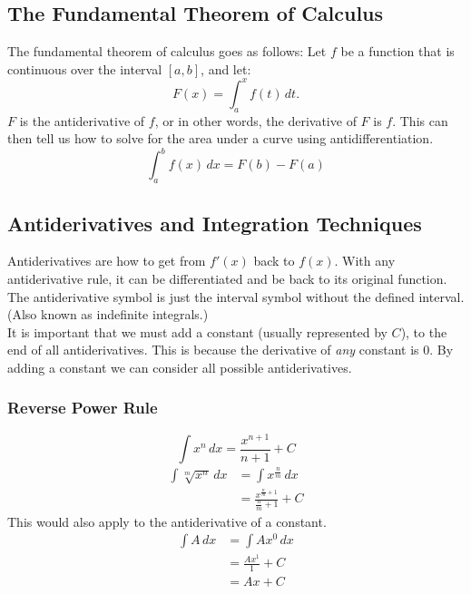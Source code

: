 \documentclass[12pt]{article}
\begin{document}
        \subsection{The Fundamental Theorem of Calculus}
            The fundamental theorem of calculus goes as follows:
            \newline \newline
            Let $f$ be a function that is continuous over the interval $[a, b]$, and let:
            \[ F(x) = \int_{a}^{x} f(t) \, dt. \]
            $F$ is the antiderivative of $f$, or in other words, the derivative of $F$ is $f$. This can then tell us how to solve for the area under a curve using antidifferentiation.
            \[ \int_{a}^{b} f(x) \, dx = F(b) - F(a) \]

        \subsection{Antiderivatives and Integration Techniques}
            Antiderivatives are how to get from $f'(x)$ back to $f(x)$. With any antiderivative rule, it can be differentiated and be back to its original function. The antiderivative symbol is just the interval symbol without the defined interval. (Also known as indefinite integrals.)
            \\ It is important that we must add a constant (usually represented by $C$), to the end of all antiderivatives. This is because the derivative of \textit{any} constant is $0$. By adding a constant we can consider all possible antiderivatives. %
            \subsubsection{Reverse Power Rule}
                \[ \int x^n \, dx = \frac{x^{n+1}}{n+1} + C\]
                \begin{align*}
                    \int \sqrt[m]{x^n} \, dx &= \int x^{\frac{n}{m}} \, dx \\[6pt]
                    &= \frac{x^{\frac{n}{m} + 1}}{\frac{n}{m} + 1} + C
                \end{align*}
                \newline
                This would also apply to the antiderivative of a constant.
                \begin{align*}
                    \int A \, dx &= \int Ax^0 \, dx \\
                    &= \frac{Ax^1}{1} + C\\[6pt]
                    &= Ax + C
                \end{align*}
\end{document}

